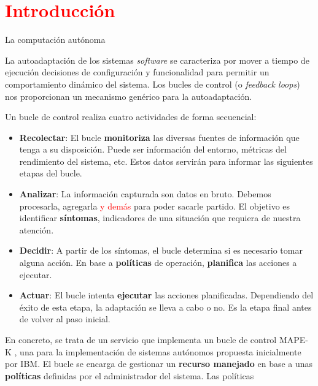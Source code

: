 
\chapter{\textcolor{red}{Introducción}}
\label{chap:introduccion}


La computación autónoma

La autoadaptación de los sistemas \emph{software} se caracteriza por mover a tiempo de ejecución decisiones de configuración y funcionalidad para permitir un comportamiento dinámico del sistema. \cite{brunEngineeringSelfAdaptiveSystems2009} Los bucles de control (o \emph{feedback loops}) nos proporcionan un mecanismo genérico para la autoadaptación.

Un bucle de control realiza cuatro actividades de forma secuencial:

\begin{itemize}
  \item \textbf{Recolectar}: El bucle \textbf{monitoriza} las diversas fuentes de información que tenga a su disposición. Puede ser información del entorno, métricas del rendimiento del sistema, etc. Estos datos servirán para informar las siguientes etapas del bucle.

  \item \textbf{Analizar}: La información capturada son datos en bruto. Debemos procesarla, agregarla \textcolor{red}{y demás} para poder sacarle partido. El objetivo es identificar \textbf{síntomas}, indicadores de una situación que requiera de nuestra atención.

  \item \textbf{Decidir}: A partir de los síntomas, el bucle determina si es necesario tomar alguna acción. En base a \textbf{políticas} de operación, \textbf{planifica} las acciones a ejecutar.

  \item \textbf{Actuar}: El bucle intenta \textbf{ejecutar} las acciones planificadas. Dependiendo del éxito de esta etapa, la adaptación se lleva a cabo o no. Es la etapa final antes de volver al paso inicial.
\end{itemize}

En concreto, se trata de un servicio que implementa un bucle de control MAPE-K \cite{ArchitecturalBlueprintAutonomic2006, fonsServiciosAdaptivereadyPara2021}, una para la implementación de sistemas autónomos propuesta inicialmente por IBM. El bucle se encarga de gestionar un \textbf{recurso manejado} en base a unas \textbf{políticas} definidas por el administrador del sistema. Las políticas

